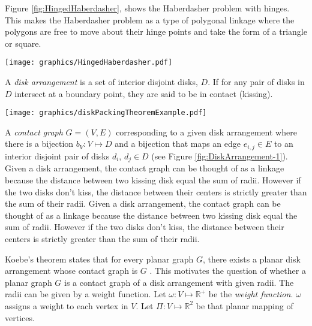 \documentclass[10pt]{CSUNthesis}
\theoremstyle{plain}%
\theoremstyle{definition}
\theoremstyle{remark}
\newcommand{\bbR}{{\mathbb{R}}}
\newcommand{\bbr}{{\mathbb{R}}}
\begin{document}
Figure \ref{fig:HingedHaberdasher}, shows the Haberdasher problem with hinges.  
This makes the Haberdasher problem as a type of polygonal linkage where the polygons are free to move about their hinge points and take the form of a triangle or square.  

\begin{minipage}{\linewidth}
\begin{center}
\texttt{[image: graphics/HingedHaberdasher.pdf]}
\end{center}
\label{fig:HingedHaberdasher}
\end{minipage}


 A \textit{disk arrangement} is a set of interior disjoint disks, $D$.  
 If for any pair of disks in $D$ intersect at a boundary point, they are said to be in contact (kissing).

\begin{minipage}{\linewidth}
\texttt{[image: graphics/diskPackingTheoremExample.pdf]}
\label{fig:DiskArrangement-1}
\end{minipage}

A \textit{contact graph} $G=(V,E)$ corresponding to a given disk arrangement where there is a bijection $b_V: V \mapsto D$ and a bijection that maps an edge $e_{i,j} \in E$ to an interior disjoint pair of disks $d_i$, $d_j \in D$ (see Figure \ref{fig:DiskArrangement-1}).
Given a disk arrangement, the contact graph can be thought of as a linkage because the distance between two kissing disk equal the sum of radii.  
However if the two disks don't kiss, the distance between their centers is strictly greater than the sum of their radii.
Given a disk arrangement, the contact graph can be thought of as a linkage because the distance between two kissing disk equal the sum of radii.  
However if the two disks don't kiss, the distance between their centers is strictly greater than the sum of their radii.

Koebe's theorem states that for every planar graph $G$, there exists a planar disk arrangement whose contact graph is $G$ \cite{koebe1936kontaktprobleme}.
This motivates the question of whether a planar graph $G$ is a contact graph of a disk arrangement with given radii.
The radii can be given by a weight function.
Let $\omega: V \mapsto \bbR^+$ be the \textit{weight function}.  
$\omega$ assigns a weight to each vertex in $V$.  
Let $\Pi:V \mapsto \bbr^2$ be that planar mapping of vertices.
\end{document}
